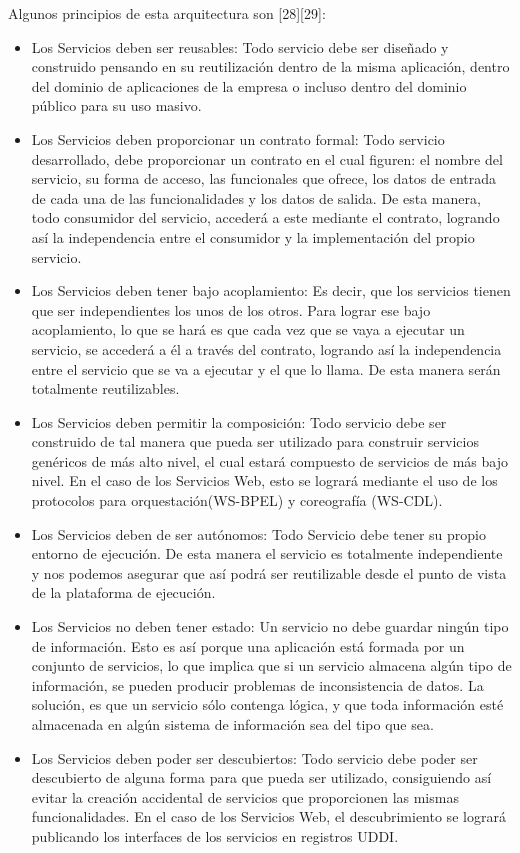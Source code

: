 Algunos principios de esta arquitectura son [28][29]:
\begin{itemize}
 \item Los Servicios deben ser reusables: Todo servicio debe ser diseñado y construido pensando en su reutilización dentro de la misma 
  aplicación, dentro del dominio de aplicaciones de la empresa o incluso dentro del dominio público para su uso masivo.
 \item Los Servicios deben proporcionar un contrato formal: Todo servicio desarrollado, debe proporcionar un contrato en el cual figuren: 
    el nombre del servicio, su forma de acceso, las funcionales que ofrece, los datos de entrada de cada una de las funcionalidades y 
    los datos de salida. De esta manera, todo consumidor del servicio, accederá a este mediante el contrato, logrando así la independencia 
    entre el consumidor y la implementación del propio servicio.
   
   \item Los Servicios deben tener bajo acoplamiento: Es decir, que los servicios tienen que ser independientes los unos de los otros. Para 
    lograr ese bajo acoplamiento, lo que se hará es que cada vez que se vaya a ejecutar un servicio, se accederá a él a través del contrato, 
    logrando así la independencia entre el servicio que se va a ejecutar y el que lo llama. De esta manera serán totalmente reutilizables.

   \item Los Servicios deben permitir la composición: Todo servicio debe ser construido de tal manera que pueda ser utilizado para construir 
    servicios genéricos de más alto nivel, el cual estará compuesto de servicios de más bajo nivel. En el caso de los Servicios Web, esto 
    se logrará mediante el uso de los protocolos para orquestación(WS-BPEL) y coreografía (WS-CDL).

   \item Los Servicios deben de ser autónomos: Todo Servicio debe tener su propio entorno de ejecución. De esta manera el servicio es totalmente 
    independiente y nos podemos asegurar que así podrá ser reutilizable desde el punto de vista de la plataforma de ejecución.

    \item Los Servicios no deben tener estado: Un servicio no debe guardar ningún tipo de información. Esto es así porque una aplicación está 
    formada por un conjunto de servicios, lo que implica que si un servicio almacena algún tipo de información, se pueden producir 
    problemas de inconsistencia de datos. La solución, es que un servicio sólo contenga lógica, y que toda información esté almacenada 
    en algún sistema de información sea del tipo que sea.

    \item Los Servicios deben poder ser descubiertos: Todo servicio debe poder ser descubierto de alguna forma para que pueda ser utilizado, 
    consiguiendo así evitar la creación accidental de servicios que proporcionen las mismas funcionalidades. En el caso de los Servicios 
    Web, el descubrimiento se logrará publicando los interfaces de los servicios en registros UDDI.
\end{itemize}
